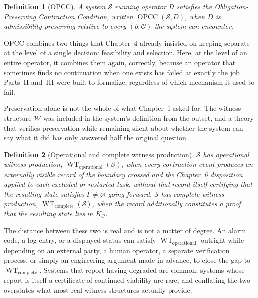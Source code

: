 \documentclass[11pt]{report}
\newtheorem{definition}{Definition}[chapter]
\begin{document}
\begin{definition}[OPCC]
A system $\mathcal S$ running operator $D$ satisfies the Obligation-Preserving Contraction Condition, written $\operatorname{OPCC}(\mathcal S, D)$, when $D$ is admissibility-preserving relative to every $(b, \mathcal O)$ the system can encounter.
\end{definition}

OPCC combines two things that Chapter~4 already insisted on keeping separate at the level of a single decision: feasibility and selection. Here, at the level of an entire operator, it combines them again, correctly, because an operator that sometimes finds no continuation when one exists has failed at exactly the job Parts~II and~III were built to formalize, regardless of which mechanism it used to fail.

Preservation alone is not the whole of what Chapter~1 asked for. The witness structure $\mathcal W$ was included in the system's definition from the outset, and a theory that verifies preservation while remaining silent about whether the system can say what it did has only answered half the original question.

\begin{definition}[Operational and complete witness production]
$\mathcal S$ has operational witness production, $\operatorname{WT}_{\mathrm{operational}}(\mathcal S)$, when every contraction event produces an externally visible record of the boundary crossed and the Chapter~6 disposition applied to each excluded or restarted task, without that record itself certifying that the resulting state satisfies $\Gamma \ne \varnothing$ going forward. $\mathcal S$ has complete witness production, $\operatorname{WT}_{\mathrm{complete}}(\mathcal S)$, when the record additionally constitutes a proof that the resulting state lies in $K_{\mathcal O}$.
\end{definition}

The distance between these two is real and is not a matter of degree. An alarm code, a log entry, or a displayed status can satisfy $\operatorname{WT}_{\mathrm{operational}}$ outright while depending on an external party, a human operator, a separate verification process, or simply an engineering argument made in advance, to close the gap to $\operatorname{WT}_{\mathrm{complete}}$. Systems that report having degraded are common; systems whose report is itself a certificate of continued viability are rare, and conflating the two overstates what most real witness structures actually provide.
\end{document}
